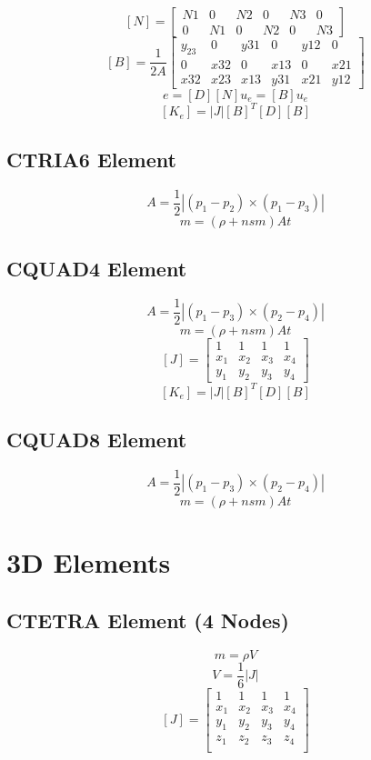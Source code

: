 \documentclass[a4paper,12pt]{article}
\begin{document}
     \[ [N] = \left[ \begin{array}{cccccc}
               N1 &  0 & N2 &  0 & N3 & 0  \\
               0  & N1 &  0 & N2 &  0 & N3
            \end{array}\right]\]
     \[ [B] = \frac{1}{2A} \left[ \begin{array}{cccccc}
               y_23 &   0 & y31 &   0 & y12 &   0 \\
               0    & x32 &   0 & x13 &   0 & x21 \\
               x32  & x23 & x13 & y31 & x21 & y12
            \end{array}\right]\]
     \[ e=[D] [N] u_e = [B] u_e    \]
     \[  [K_e] = |J| [B]^T [D] [B] \]

   \subsection{CTRIA6 Element}
     \[ A = \frac{1}{2} |(p_1-p_2) \times (p_1-p_3)| \]
     \[ m = (\rho +nsm) A t \]

   \subsection{CQUAD4 Element}
     \[ A = \frac{1}{2} |(p_1-p_3) \times (p_2-p_4)| \]
     \[ m = (\rho +nsm) A t \]
    \[ [J] = \left[ \begin{array}{cccc}
               1 &     1 & 1   & 1   \\
               x_1 & x_2 & x_3 & x_4 \\
               y_1 & y_2 & y_3 & y_4 
            \end{array}\right]\]
     \[  [K_e] = |J| [B]^T [D] [B] \]

   \subsection{CQUAD8 Element}
     \[ A = \frac{1}{2} |(p_1-p_3) \times (p_2-p_4)| \]
     \[ m = (\rho +nsm) A t \]

\section{3D Elements}
   \subsection{CTETRA Element (4 Nodes)}
     \[ m = \rho V \]
    \[ V = \frac{1}{6} |J| \]
    \[ [J] = \left[ \begin{array}{cccc}
               1 & 1 & 1 & 1 \\
               x_1 & x_2 & x_3 & x_4 \\
               y_1 & y_2 & y_3 & y_4 \\
               z_1 & z_2 & z_3 & z_4 \\
            \end{array}\right]\]
\end{document}
